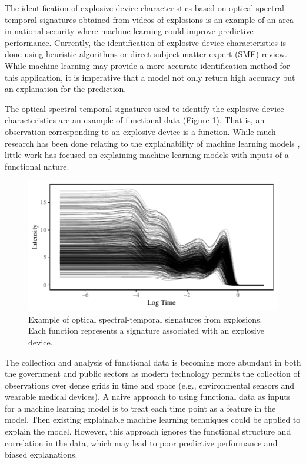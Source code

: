 \documentclass[letterpaper]{article}
\begin{document}
The identification of explosive device characteristics based on optical spectral-temporal signatures obtained from videos of explosions is an example of an area in national security where machine learning could improve predictive performance. Currently, the identification of explosive device characteristics is done using heuristic algorithms or direct subject matter expert (SME) review. While machine learning may provide a more accurate identification method for this application, it is imperative that a model not only return high accuracy but an explanation for the prediction.

The optical spectral-temporal signatures used to identify the explosive device characteristics are an example of functional data (Figure \ref{fig1}). That is, an observation corresponding to an explosive device is a function. While much research has been done relating to the explainability of machine learning models \cite{gilpin:2018,guidotti:2018,hohman:2018,molnar:2019,montavon:2018}, little work has focused on explaining machine learning models with inputs of a functional nature. 

\begin{figure}[t]
\centering
\includegraphics[width=.95\columnwidth]{fig1}
\caption{Example of optical spectral-temporal signatures from explosions. Each function represents a signature associated with an explosive device.}
\label{fig1}
\end{figure}

The collection and analysis of functional data is becoming more abundant in both the government and public sectors as modern technology permits the collection of observations over dense grids in time and space (e.g., environmental sensors and wearable medical devices). A naive approach to using functional data as inputs for a machine learning model is to treat each time point as a feature in the model. Then existing explainable machine learning techniques could be applied to explain the model. However, this approach ignores the functional structure and correlation in the data, which may lead to poor predictive performance and biased explanations.
\end{document}
